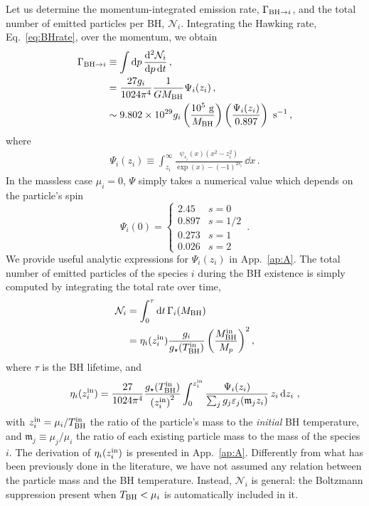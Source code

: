 \documentclass[aps,prd,reprint,twocolumn,preprintnumbers,floatfix,nofootinbib]{revtex4-1}
\newcommand{\TBH}{T_{\rm BH}}
\newcommand{\MBH}{M_{\rm BH}}
\newcommand{\MPL}{M_p}
\begin{document}
Let us determine the momentum-integrated emission rate, $\Gamma_{{\rm BH} \to i}$, and the total number of emitted particles per BH, $\mathcal{N}_i$. Integrating the Hawking rate, Eq.~\eqref{eq:BHrate}, over the momentum, we obtain
\begin{align}\label{eq:Hwtotrate}
   \Gamma_{{\rm BH} \to i} &\equiv\int \dd{p} \frac{\dd^2 \mathcal{N}_{i}}{\dd p\,\dd t}\notag\,,\\
   &=\frac{27 g_i}{1024\pi^4}\frac{1}{G\MBH} \Psi_i (z_i)\notag\,,\\
    &\sim 9.802\times 10^{29} g_i \left(\frac{10^5 {\rm~g}}{\MBH}\right)\left(\frac{\Psi_i (z_i)}{0.897}\right){\rm~s^{-1}}\,,
\end{align}
where
\begin{align*}
    \Psi_i (z_i) \equiv \int_{z_i}^\infty \frac{\psi_{s_i}(x)(x^2-z_i^2)}{\exp(x)-(-1)^{2s_i}} \,\dd{x}\,.
\end{align*}
In the massless case $\mu_i=0$, $\Psi$ simply takes a numerical value which depends on the particle's spin~\cite{Ukwatta:2015iba}
\begin{equation}\label{eq:psi0}
    \Psi_i (0) = \begin{cases} 
    2.45 & s=0 \\
    0.897 & s=1/2 \\
    0.273 & s=1 \\
    0.026 & s = 2
    \end{cases}\,.
\end{equation}
We provide useful analytic expressions for $\Psi_i (z_i)$ in App.~\ref{ap:A}.
The total number of emitted particles of the species $i$ during the BH existence is simply computed by integrating the total rate over time,
\begin{align}
    \mathcal{N}_i&=\int_0^{\tau}\dd{t}\Gamma_i(\MBH)\notag\\
    &= \eta_i(z_i^{\rm in})\frac{g_i}{g_{\star}(\TBH^{\rm in})} \left(\frac{\MBH^{\rm in}}{\MPL}\right)^2 ,
    \label{eq:semi_analytic}
\end{align}
where $\tau$ is the BH lifetime, and 
\begin{align}
    \eta_i(z_i^{\rm in})=\frac{27}{1024\pi^4}\frac{g_{\star}(\TBH^{\rm in})}{\left(z_i^{\rm in}\right)^2}\int_0^{z_i^{\rm in}}\frac{\Psi_i(z_i)}{\sum_j g_j\varepsilon_j(\mathfrak{m}_j z_i)}\,z_i\dd{z_i}\,,
\end{align}
with $z_i^{\rm in} = \mu_i/\TBH^{\rm in}$ the ratio of the particle's mass to the \emph{initial} BH temperature, and $\mathfrak{m}_j\equiv \mu_j/\mu_i$ the ratio of each existing particle mass to the mass of the species $i$. The derivation of $\eta_i(z_i^{\rm in})$ is presented in App.~\ref{ap:A}. Differently from what has been previously done in the literature, we have not assumed any relation between the particle mass and the BH temperature. Instead, $\mathcal{N}_i$ is general: the Boltzmann suppression present when $\TBH < \mu_i$ is automatically included in it. 
\end{document}
